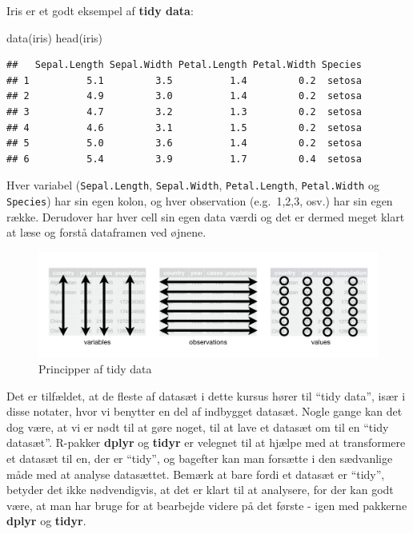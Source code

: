 \documentclass[
]{book}
\newenvironment{Shaded}{\begin{snugshade}}{\end{snugshade}}
\newcommand{\FunctionTok}[1]{\textcolor[rgb]{0.00,0.00,0.00}{#1}}
\newcommand{\NormalTok}[1]{#1}
\begin{document}
Iris er et godt eksempel af \textbf{tidy data}:

\begin{Shaded}
\begin{Highlighting}[]
\FunctionTok{data}\NormalTok{(iris)}
\FunctionTok{head}\NormalTok{(iris)}
\end{Highlighting}
\end{Shaded}

\begin{verbatim}
##   Sepal.Length Sepal.Width Petal.Length Petal.Width Species
## 1          5.1         3.5          1.4         0.2  setosa
## 2          4.9         3.0          1.4         0.2  setosa
## 3          4.7         3.2          1.3         0.2  setosa
## 4          4.6         3.1          1.5         0.2  setosa
## 5          5.0         3.6          1.4         0.2  setosa
## 6          5.4         3.9          1.7         0.4  setosa
\end{verbatim}

Hver variabel (\texttt{Sepal.Length}, \texttt{Sepal.Width}, \texttt{Petal.Length}, \texttt{Petal.Width} og \texttt{Species}) har sin egen kolon, og hver observation (e.g.~1,2,3, osv.) har sin egen række. Derudover har hver cell sin egen data værdi og det er dermed meget klart at læse og forstå dataframen ved øjnene.

\begin{figure}
\centering
\includegraphics[width=1\textwidth,height=\textheight]{plots/tidy-1.png}
\caption{Principper af tidy data}
\end{figure}

Det er tilfældet, at de fleste af datasæt i dette kursus hører til ``tidy data'', især i disse notater, hvor vi benytter en del af indbygget datasæt. Nogle gange kan det dog være, at vi er nødt til at gøre noget, til at lave et datasæt om til en ``tidy datasæt''. R-pakker \textbf{dplyr} og \textbf{tidyr} er velegnet til at hjælpe med at transformere et datasæt til en, der er ``tidy'', og bagefter kan man forsætte i den sædvanlige måde med at analyse datasættet. Bemærk at bare fordi et datasæt er ``tidy'', betyder det ikke nødvendigvis, at det er klart til at analysere, for der kan godt være, at man har bruge for at bearbejde videre på det første - igen med pakkerne \textbf{dplyr} og \textbf{tidyr}.
\end{document}
